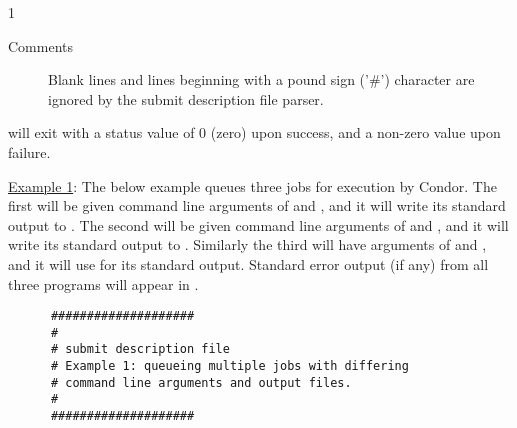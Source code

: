 \begin{ManPage}{\label{man-condor-submit}}{1}
\begin{description}
\item[Comments] Blank lines and lines beginning with a 
pound sign
('\#')
character are ignored by the submit description file parser. 

\end{description}


\begin{Options}






\end{Options}

\ExitStatus

 will exit with a status value of 0 (zero) upon success, and a
non-zero value upon failure.

\Examples

\underline{Example 1}: The below example queues three jobs for
execution by Condor. The first will be given command line arguments of
 and , and it will write its standard output
to .
The second will be given command line arguments of 
 and , and it will
write its standard output to .
Similarly the third will have
arguments of 
 and , and it will use  for its standard
output. Standard error output (if any) from all three programs will
appear in .

\begin{verbatim}
      ####################
      #
      # submit description file
      # Example 1: queueing multiple jobs with differing
      # command line arguments and output files.
      #                                                                      
      ####################                                                   
                                                                         

\end{verbatim}
\end{ManPage}

